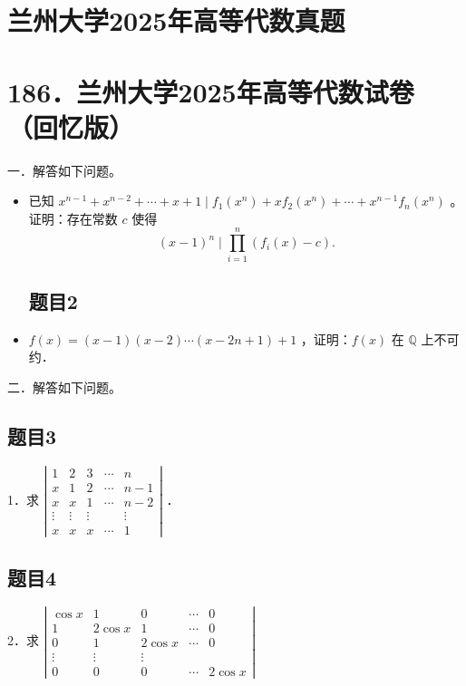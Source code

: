 \documentclass{article}
\begin{document}
\section*{兰州大学2025年高等代数真题}
\section*{186．兰州大学2025年高等代数试卷（回忆版）}
一．解答如下问题。

\begin{itemize}

\subsection{题目1}
  \item[1．] 已知 \(x^{n-1}+x^{n-2}+\cdots+x+1 \mid f_{1}\left(x^{n}\right)+x f_{2}\left(x^{n}\right)+\cdots+x^{n-1} f_{n}\left(x^{n}\right)\) 。证明：存在常数 \(c\) 使得
\[
(x-1)^{n} \mid \prod_{i=1}^{n}\left(f_{i}(x)-c\right) .
\]

\subsection{题目2}
  \item[2．] \(f(x)=(x-1)(x-2) \cdots(x-2 n+1)+1\) ，证明：\(f(x)\) 在 \(\mathbb{Q}\) 上不可约．
\end{itemize}

二．解答如下问题。\\

\subsection{题目3}
1．求 \(\left|\begin{array}{ccccc}1 & 2 & 3 & \cdots & n \\ x & 1 & 2 & \cdots & n-1 \\ x & x & 1 & \cdots & n-2 \\ \vdots & \vdots & \vdots & & \vdots \\ x & x & x & \cdots & 1\end{array}\right|\) ．

\subsection{题目4}
2．求 \(\left|\begin{array}{ccccc}\cos x & 1 & 0 & \cdots & 0 \\ 1 & 2 \cos x & 1 & \cdots & 0 \\ 0 & 1 & 2 \cos x & \cdots & 0 \\ \vdots & \vdots & \vdots & & \\ 0 & 0 & 0 & \cdots & 2 \cos x\end{array}\right|\)
\end{document}
